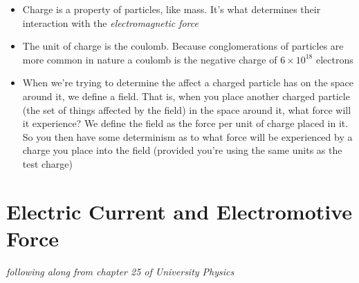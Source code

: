 \documentclass[11pt]{article}
\begin{document}
\begin{itemize}
\tightlist
\item
  Charge is a property of particles, like mass. It's what determines
  their interaction with the \emph{electromagnetic force}
\item
  The unit of charge is the coulomb. Because conglomerations of
  particles are more common in nature a coulomb is the negative charge
  of \(6\times10^{18}\) electrons
\item
  When we're trying to determine the affect a charged particle has on
  the space around it, we define a field. That is, when you place
  another charged particle (the set of things affected by the field) in
  the space around it, what force will it experience? We define the
  field as the force per unit of charge placed in it. So you then have
  some determinism as to what force will be experienced by a charge you
  place into the field (provided you're using the same units as the test
  charge)
\end{itemize}

\hypertarget{electric-current-and-electromotive-force}{%
\section{Electric Current and Electromotive
Force}\label{electric-current-and-electromotive-force}}

\emph{following along from chapter 25 of University Physics}
\end{document}
